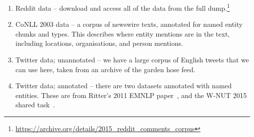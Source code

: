 \documentclass[journal,10pt,draftclsnofoot,onecolumn]{IEEEtran}
\begin{document}
\begin{enumerate}
	\item Reddit data -- download and access all of the data from the full dump.\footnote{\url{https://archive.org/details/2015_reddit_comments_corpus}}
	\item CoNLL 2003 data -- a corpus of newswire texts, annotated for named entity chunks and types.
	This describes where entity mentions are in the text, including locations, organisations, and person mentions.
	\item Twitter data; unannotated -- we have a large corpus of English tweets that we can use here, taken from an archive of the garden hose feed.
	\item Twitter data; annotated -- there are two datasets annotated with named entities. These are from Ritter's 2011 EMNLP paper~\cite{ritter2011named}, and the W-NUT 2015 shared task~\cite{baldwin2015shared}.
\end{enumerate}


%
%
%
%
\end{document}
